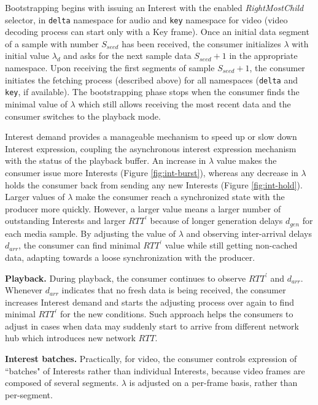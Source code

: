 \documentclass{icn/sig-alternate-2013} %
\newcommand{\wConcept}{Interest demand}
\begin{document}
Bootstrapping begins with issuing an Interest with the enabled \textit{RightMostChild} selector, in \texttt{delta} namespace for audio and \texttt{key} namespace for video (video decoding process can start only with a Key frame). %
Once an initial data segment of a sample with number $S_{seed}$ has been received, the consumer initializes $\lambda$ with initial value $\lambda_d$ and asks for the next sample data $S_{seed}+1$ in the appropriate namespace. Upon receiving the first segments of sample $S_{seed}+1$, the consumer initiates the fetching process (described above) for all namespaces (\texttt{delta} and \texttt{key}, if available). The bootstrapping phase stops when the consumer finds the minimal value of $\lambda$ which still allows receiving the most recent data and the consumer switches to the playback mode.

\wConcept{} provides a manageable mechanism to speed up or slow down Interest expression, coupling the asynchronous interest expression mechanism with the status of the playback buffer. An increase in $\lambda$ value makes the consumer issue more Interests (Figure \ref{fig:int-burst}), whereas any decrease in $\lambda$ holds the consumer back from sending any new Interests (Figure \ref{fig:int-hold}). Larger values of $\lambda$ make the consumer reach a synchronized state with the producer more quickly. However, a larger value means a larger number of outstanding Interests and larger $RTT^\prime$ because of longer generation delays $d_{gen}$ for each media sample. By adjusting the value of $\lambda$ and observing inter-arrival delays $d_{arr}$, the consumer can find minimal $RTT^\prime$ value while still getting non-cached data, adapting towards a loose synchronization with the producer.

\textbf{Playback.}  During playback, the consumer continues to observe $RTT^\prime$ and $d_{arr}$. Whenever $d_{arr}$ indicates that no fresh data is being received, the consumer increases \wConcept{} and starts the adjusting process over again to find minimal $RTT^\prime$ for the new conditions. Such approach helps the consumers to adjust in cases when data may suddenly start to arrive from different network hub which introduces new network $RTT$.

\textbf{Interest batches.} Practically, for video, the consumer controls expression of ``batches" of Interests rather than individual Interests, because video frames are composed of several segments.  $\lambda$ is adjusted on a per-frame basis, rather than per-segment. 
\end{document}
